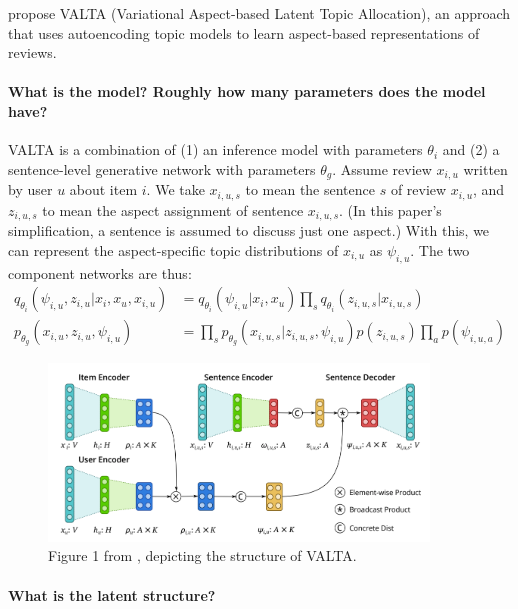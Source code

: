 \documentclass[11pt]{article}
\begin{document}
\cite{esmaeili2018structured} propose VALTA (Variational Aspect-based Latent Topic Allocation), an approach that uses autoencoding topic models to learn aspect-based representations of reviews.

\paragraph{What is the model? Roughly how many parameters does the model have?} 

VALTA is a combination of (1) an inference model with parameters $\theta_i$ and (2) a sentence-level generative network with parameters $\theta_g$. Assume review $x_{i,u}$ written by user $u$ about item $i$. We take $x_{i,u,s}$ to mean the sentence $s$ of review $x_{i,u}$, and $z_{i,u,s}$ to mean the aspect assignment of sentence $x_{i,u,s}$. (In this paper's simplification, a sentence is assumed to discuss just one aspect.) With this, we can represent the aspect-specific topic distributions of $x_{i,u}$ as $\psi_{i,u}$. The two component networks are thus:
\begin{align*}
  q_{\theta_i}(\psi_{i,u},z_{i,u}|x_i,x_u,x_{i,u}) &= q_{\theta_i}(\psi_{i,u} | x_i,x_u) \prod_s q_{\theta_i}(z_{i,u,s}|x_{i,u,s}) \\
  p_{\theta_g}(x_{i,u},z_{i,u},\psi_{i,u}) &= \prod_s p_{\theta_g}(x_{i,u,s}|z_{i,u,s},\psi_{i,u})p(z_{i,u,s})\prod_a p(\psi_{i,u,a})
\end{align*}

\begin{figure}[h]
  \centering
  \includegraphics[width=0.9\textwidth]{esmaili-fig1.png}
  \caption{Figure 1 from \cite{esmaeili2018structured}, depicting the structure of VALTA.}
  \label{fig:valta}
\end{figure}

\paragraph{What is the latent structure?}
\end{document}
